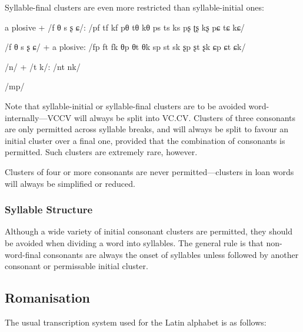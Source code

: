 \documentclass[grammar]{subfiles}
\begin{document}
	Syllable-final clusters are even more restricted than syllable-initial ones:

	\begin{itemize*}
	\item a plosive + /f θ s ʂ ɕ/: /pf tf kf pθ tθ kθ ps ts ks pʂ ʈʂ kʂ pɕ tɕ kɕ/
	\item /f θ s ʂ ɕ/ + a plosive: /fp ft fk θp θt θk sp st sk ʂp ʂt ʂk ɕp ɕt ɕk/
	\item /n/ + /t k/: /nt nk/
	\item /mp/
	\end{itemize*}

	Note that syllable-initial or syllable-final clusters are to be avoided word-internally—VCCV will always be split into VC.CV\@. Clusters of three consonants are only permitted across syllable breaks, and will always be split to favour an initial cluster over a final one, provided that the combination of consonants is permitted. Such clusters are extremely rare, however.

	Clusters of four or more consonants are never permitted—clusters in loan words will always be simplified or reduced.
	
	\subsubsection{Syllable Structure}
	\label{sssec:syllables}

	Although a wide variety of initial consonant clusters are permitted, they should be avoided when dividing a word into syllables. The general rule is that non-word-final consonants are always the onset of syllables unless followed by another consonant or permissable initial cluster.

	\subsection{Romanisation}
	\label{ssec:romanisation}

	The usual transcription system used for the Latin alphabet is as follows:
\end{document}
